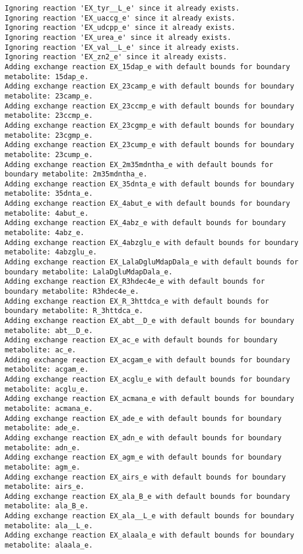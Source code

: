 \documentclass[
  letterpaper,
  DIV=11,
  numbers=noendperiod]{scrartcl}
\begin{document}
\begin{verbatim}
Ignoring reaction 'EX_tyr__L_e' since it already exists.
Ignoring reaction 'EX_uaccg_e' since it already exists.
Ignoring reaction 'EX_udcpp_e' since it already exists.
Ignoring reaction 'EX_urea_e' since it already exists.
Ignoring reaction 'EX_val__L_e' since it already exists.
Ignoring reaction 'EX_zn2_e' since it already exists.
Adding exchange reaction EX_15dap_e with default bounds for boundary metabolite: 15dap_e.
Adding exchange reaction EX_23camp_e with default bounds for boundary metabolite: 23camp_e.
Adding exchange reaction EX_23ccmp_e with default bounds for boundary metabolite: 23ccmp_e.
Adding exchange reaction EX_23cgmp_e with default bounds for boundary metabolite: 23cgmp_e.
Adding exchange reaction EX_23cump_e with default bounds for boundary metabolite: 23cump_e.
Adding exchange reaction EX_2m35mdntha_e with default bounds for boundary metabolite: 2m35mdntha_e.
Adding exchange reaction EX_35dnta_e with default bounds for boundary metabolite: 35dnta_e.
Adding exchange reaction EX_4abut_e with default bounds for boundary metabolite: 4abut_e.
Adding exchange reaction EX_4abz_e with default bounds for boundary metabolite: 4abz_e.
Adding exchange reaction EX_4abzglu_e with default bounds for boundary metabolite: 4abzglu_e.
Adding exchange reaction EX_LalaDgluMdapDala_e with default bounds for boundary metabolite: LalaDgluMdapDala_e.
Adding exchange reaction EX_R3hdec4e_e with default bounds for boundary metabolite: R3hdec4e_e.
Adding exchange reaction EX_R_3httdca_e with default bounds for boundary metabolite: R_3httdca_e.
Adding exchange reaction EX_abt__D_e with default bounds for boundary metabolite: abt__D_e.
Adding exchange reaction EX_ac_e with default bounds for boundary metabolite: ac_e.
Adding exchange reaction EX_acgam_e with default bounds for boundary metabolite: acgam_e.
Adding exchange reaction EX_acglu_e with default bounds for boundary metabolite: acglu_e.
Adding exchange reaction EX_acmana_e with default bounds for boundary metabolite: acmana_e.
Adding exchange reaction EX_ade_e with default bounds for boundary metabolite: ade_e.
Adding exchange reaction EX_adn_e with default bounds for boundary metabolite: adn_e.
Adding exchange reaction EX_agm_e with default bounds for boundary metabolite: agm_e.
Adding exchange reaction EX_airs_e with default bounds for boundary metabolite: airs_e.
Adding exchange reaction EX_ala_B_e with default bounds for boundary metabolite: ala_B_e.
Adding exchange reaction EX_ala__L_e with default bounds for boundary metabolite: ala__L_e.
Adding exchange reaction EX_alaala_e with default bounds for boundary metabolite: alaala_e.

\end{verbatim}
\end{document}
